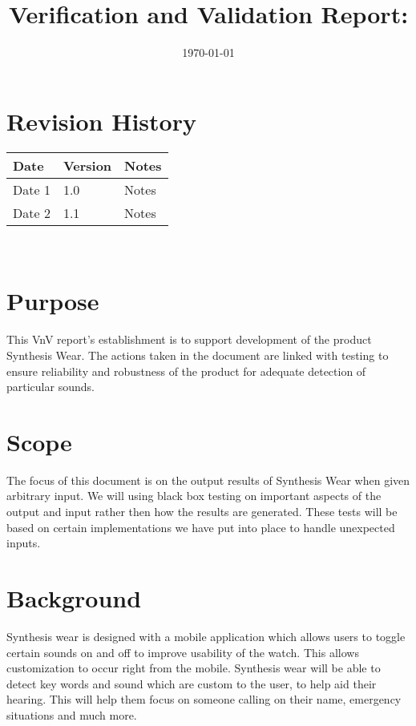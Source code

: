 \documentclass[12pt, titlepage]{article}
\begin{document}
\title{Verification and Validation Report: \progname} 
\author{\authname}
\date{\today}
	
\maketitle


\section{Revision History}

\begin{tabularx}{\textwidth}{p{3cm}p{2cm}X}
\toprule {\bf Date} & {\bf Version} & {\bf Notes}\\
\midrule
Date 1 & 1.0 & Notes\\
Date 2 & 1.1 & Notes\\
\bottomrule
\end{tabularx}

~\newpage

\section{Purpose}

This VnV report's establishment is to support development of the product Synthesis Wear. The actions taken in the document are linked with testing to ensure reliability and robustness of the product for adequate detection of particular sounds.

\section{Scope}

The focus of this document is on the output results of Synthesis Wear when given arbitrary input. We will using black box testing on important aspects of the output and input rather then how the results are generated. These tests will be based on certain implementations we have put into place to handle unexpected inputs.

\section{Background} 

Synthesis wear is designed with a mobile application which allows users to toggle certain sounds on and off to improve usability of the watch. This allows customization to occur right from the mobile. Synthesis wear will be able to detect key words and sound which are custom to the user, to help aid their hearing. This will help them focus on someone calling on their name, emergency situations and much more.
\end{document}
